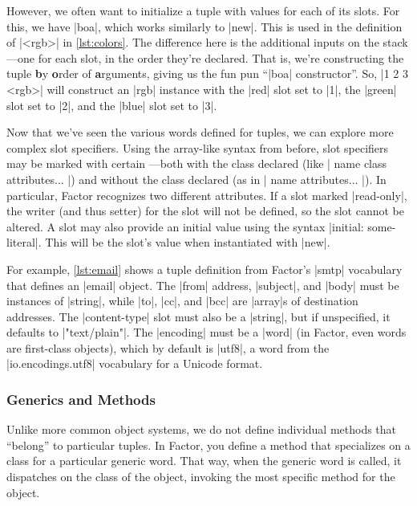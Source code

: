 However, we often want to initialize a tuple with values for each of its slots.
For this, we have \factor|boa|, which works similarly to \factor|new|.  This is
used in the definition of \factor|<rgb>| in \vref{lst:colors}.  The difference
here is the additional inputs on the stack---one for each slot, in the order
they're declared.  That is, we're constructing the tuple \textbf{b}y
\textbf{o}rder of \textbf{a}rguments, giving us the fun pun ``\factor|boa|
constructor''.  So, \factor|1 2 3 <rgb>| will construct an \factor|rgb|
instance with the \factor|red| slot set to \factor|1|, the \factor|green| slot
set to \factor|2|, and the \factor|blue| slot set to \factor|3|.


Now that we've seen the various words defined for tuples, we can explore more
complex slot specifiers.  Using the array-like syntax from before, slot
specifiers may be marked with certain ---both with the class
declared (like
%
\factor|{ name class attributes... }|)
%
and without the class declared (as in 
%
\factor|{ name attributes... }|).
%
In particular, Factor recognizes two different attributes.  If a slot marked
\factor|read-only|, the writer (and thus setter) for the slot will not be
defined, so the slot cannot be altered.  A slot may also provide an initial
value using the syntax \factor|initial: some-literal|.  This will be the slot's
value when instantiated with \factor|new|. 

For example, \vref{lst:email} shows a tuple definition from Factor's
\factor|smtp| vocabulary that defines an \factor|email| object.  The
\factor|from| address, \factor|subject|, and \factor|body| must be instances of
\factor|string|, while \factor|to|, \factor|cc|, and \factor|bcc| are
\factor|array|s of destination addresses.  The \factor|content-type| slot must
also be a \factor|string|, but if unspecified, it defaults to
\factor|"text/plain"|.  The \factor|encoding| must be a \factor|word| (in
Factor, even words are first-class objects), which by default is \factor|utf8|,
a word from the \factor|io.encodings.utf8| vocabulary for a Unicode format.

\subsubsection{Generics and Methods}

Unlike more common object systems, we do not define individual methods that
``belong'' to particular tuples.  In Factor, you define a method that
specializes on a class for a particular generic word.  That way, when the
generic word is called, it dispatches on the class of the object, invoking the
most specific method for the object.

